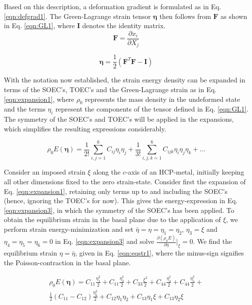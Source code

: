 \documentclass[showpacs,aps,floatfix,prb,reprint,superscriptaddress]{revtex4-1}
\begin{document}
Based on this description, a deformation gradient is formulated as in Eq. \ref{eqn:defgrad1}. The Green-Lagrange strain tensor $\bm{\eta}$ then follows from $\bm{F}$ as shown in Eq. \ref{eqn:GL1}, where $\bm{I}$ denotes the identity matrix.
\begin{equation}
\label{eqn:defgrad1} 
\bm{F} = \frac{\partial x_{i}}{ \partial X_{j}}
\end{equation}

\begin{equation}
\label{eqn:GL1} 
\bm{\eta} = \frac{1}{2} \left(\bm{F}^{T} \bm{F} - \bm{I} \right)
\end{equation}

With the notation now established, the strain energy density can be expanded in terms of the SOEC's, TOEC's and the Green-Lagrange strain  as in Eq. \ref{eqn:expansion1}, where $\rho_{0}$ represents the mass density in the undeformed state and the terms $\eta_{i}$ represent the components of the tensor defined in Eq. \ref{eqn:GL1}. The symmetry of the SOEC's and TOEC's will be applied in the expansions, which simplifies the resulting expressions considerably.

\begin{equation}
\label{eqn:expansion1} 
\rho_{0} E \left(\bm{\eta}\right) = \frac{1}{2!} \sum_{i,j=1}^{6} C_{ij} \eta_{i} \eta_{j} + \frac{1}{3!} \sum_{i,j,k=1}^{6} C_{ijk} \eta_{i} \eta_{j} \eta_{k} + \ldots
\end{equation}

Consider an imposed strain $\xi$ along the $c$-axis of an HCP-metal, initially keeping all other dimensions fixed to the zero strain-state. Consider first the expansion of Eq. \ref{eqn:expansion1}, retaining only terms up to and including the SOEC's (hence, ignoring the TOEC's for now). This gives the energy-expression in Eq. \ref{eqn:expansion3}, in which the symmetry of the SOEC's has been applied. To obtain the equilibrium strain in the basal plane due to the application of $\xi$, we perform strain energy-minimization and set $\bar{\eta} = \eta = \eta_{1} = \eta_{2}$, $\eta_{3} = \xi$ and $\eta_{4} = \eta_{5} = \eta_{6} = 0$ in Eq. \ref{eqn:expansion3} and solve $\frac{\partial \left(\rho_{0} E\right)}{\partial \eta}|_{\xi} = 0$. We find the equilibrium strain $\eta = \bar{\eta}$, given in Eq. \ref{eqn:eqstr1}, where the minus-sign signifies the Poisson-contraction in the basal plane.

\begin{multline}
\label{eqn:expansion3} 
\rho_{0} E \left(\bm{\eta}\right) = C_{11}\frac{\eta_{1}^2}{2} + C_{11}\frac{\eta_{2}^2}{2} +  C_{33}\frac{\xi^2}{2} + C_{44}\frac{\eta_{4}^2}{2} + C_{44}\frac{\eta_{5}^2}{2} + \\  \frac{1}{2} \left(C_{11}-C_{12}\right)\frac{\eta_{6}^2}{2} + C_{12}\eta_{1}\eta_{2} + C_{13}\eta_{1}\xi + C_{13}\eta_{2}\xi
\end{multline}
\end{document}
